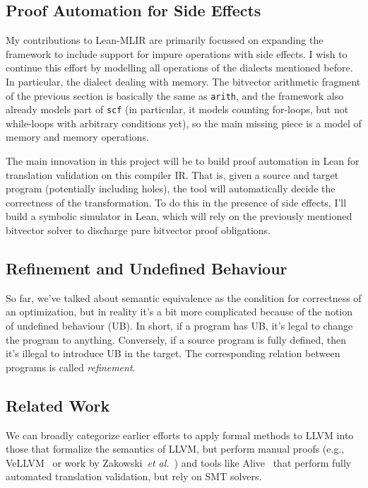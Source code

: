 \documentclass[a4paper]{scrartcl}
\newcommand*{\etal}{~\emph{et al.}}
\begin{document}
\subsection{Proof Automation for Side
Effects}\label{proof-automation-for-side-effects}

My contributions to Lean-MLIR are primarily focussed on expanding the framework to 
include support for impure operations with side effects. 
I wish to continue this effort by modelling all operations of the
dialects mentioned before. In particular, the dialect dealing with memory.
The bitvector arithmetic fragment of the previous section is basically the same as \texttt{arith}, and the
framework also already models part of \texttt{scf} (in particular, it
models counting for-loops, but not while-loops with arbitrary conditions
yet), so the main missing piece is a model of memory and memory
operations.

The main innovation in this project will be to build proof automation in
Lean for translation validation on this compiler IR. That is, given a
source and target program (potentially including holes), the tool will
automatically decide the correctness of the transformation. To do this
in the presence of side effects, I'll build a symbolic simulator in Lean, 
which will rely on the previously mentioned bitvector solver to discharge pure
bitvector proof obligations.

\subsection{Refinement and Undefined
Behaviour}\label{refinement-and-undefined-behaviour}

So far, we've talked about semantic equivalence as the condition for
correctness of an optimization, but in reality it's a bit more
complicated because of the notion of undefined behaviour (UB). In short,
if a program has UB, it's legal to change the program to anything.
Conversely, if a source program is fully defined, then it's illegal to
introduce UB in the target. The corresponding relation between programs
is called \emph{refinement}. 

\subsection{Related Work}

We can broadly categorize earlier efforts to apply formal methods to
LLVM into those that formalize the semantics of LLVM, but perform manual
proofs (e.g., VeLLVM~\cite{zhaoFormalVerificationSSABased, zhaoFormalizingLLVMIntermediate2012} 
or work by Zakowski\etal{}~\cite{zakowskiModularCompositionalExecutable2021}) and tools
like Alive~\cite{lopesAlive2BoundedTranslation2021} that perform
fully automated translation validation, but rely on SMT solvers.
\end{document}
